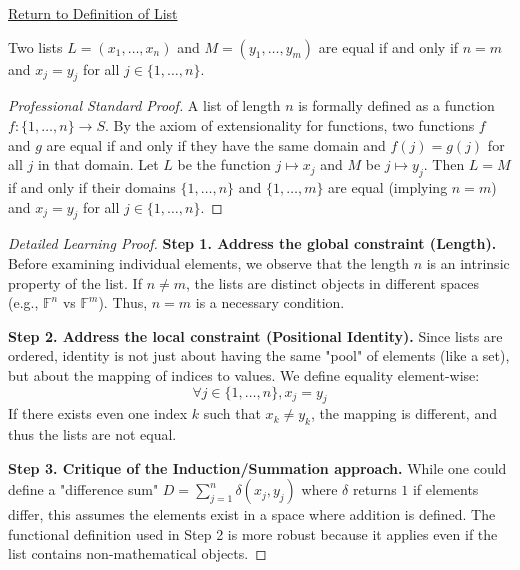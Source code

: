 \newpage
{}
\label{prf:list-equality}

\begin{remark*}[Return]
\hyperref[def:list]{Return to Definition of List}
\end{remark*}

\begin{theorem*}
Two lists $L = (x_1, \dots, x_n)$ and $M = (y_1, \dots, y_m)$ are equal if and only if $n = m$ and $x_j = y_j$ for all $j \in \{1, \dots, n\}$.
\end{theorem*}

\begin{proof}[Professional Standard Proof]
\LRAProofBodyStart
A list of length $n$ is formally defined as a function $f: \{1, \dots, n\} \to S$. By the axiom of extensionality for functions, two functions $f$ and $g$ are equal if and only if they have the same domain and $f(j) = g(j)$ for all $j$ in that domain. Let $L$ be the function $j \mapsto x_j$ and $M$ be $j \mapsto y_j$. Then $L = M$ if and only if their domains $\{1, \dots, n\}$ and $\{1, \dots, m\}$ are equal (implying $n = m$) and $x_j = y_j$ for all $j \in \{1, \dots, n\}$.
\end{proof}

\begin{proof}[Detailed Learning Proof]
\LRAProofBodyStart

\textbf{Step 1. Address the global constraint (Length).}
Before examining individual elements, we observe that the length $n$ is an intrinsic property of the list. If $n \neq m$, the lists are distinct objects in different spaces (e.g., $\mathbb{F}^n$ vs $\mathbb{F}^m$). Thus, $n=m$ is a necessary condition.

\textbf{Step 2. Address the local constraint (Positional Identity).}
Since lists are ordered, identity is not just about having the same "pool" of elements (like a set), but about the mapping of indices to values. We define equality element-wise:
\[ \forall j \in \{1, \dots, n\}, x_j = y_j \]
If there exists even one index $k$ such that $x_k \neq y_k$, the mapping is different, and thus the lists are not equal.

\textbf{Step 3. Critique of the Induction/Summation approach.}
While one could define a "difference sum" $D = \sum_{j=1}^n \delta(x_j, y_j)$ where $\delta$ returns $1$ if elements differ, this assumes the elements exist in a space where addition is defined. The functional definition used in Step 2 is more robust because it applies even if the list contains non-mathematical objects.
\end{proof}

